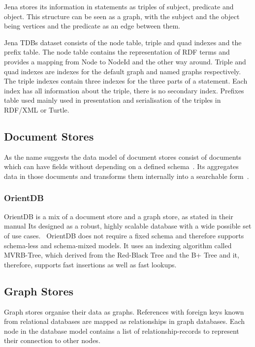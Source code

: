 Jena stores its information in statements as triples of subject, predicate and object.
This structure can be seen as a graph, with the subject and the object being vertices and the predicate as an edge between them.

Jena TDBs dataset consists of the node table, triple and quad indexes and the prefix table.
The node table contains the representation of RDF terms and provides a mapping from Node to NodeId and the other way around.
Triple and quad indexes are indexes for the default graph and named graphs respectively.
The triple indexes contain three indexes for the three parts of a statement.
Each index has all information about the triple,
there is no secondary index.
Prefixes table used mainly used in presentation and serialisation of the triples in RDF/XML or Turtle.~\cite{ApacheTDB}

\subsection{Document Stores}
As the name suggests the data model of document stores consist of documents which can have fields without depending on a defined schema~\cite{OrientDB}.
Its aggregates data in those documents and transforms them internally into a searchable form~\cite{Techopedia2017}.

\subsubsection{OrientDB}
OrientDB is a mix of a document store and a graph store,
as stated in their manual 
Its designed as a robust, highly scalable database with a wide possible set of use cases.~\cite{OrientDB}
OrientDB does not require a fixed schema and therefore supports schema-less and schema-mixed models.
It uses an indexing algorithm called MVRB-Tree,
which derived from the Red-Black Tree and the B+ Tree and it,
therefore,
supports fast insertions as well as fast lookups.\cite{Abubakar2014}

\subsection{Graph Stores}
\label{ch:background:se:graphStores}
Graph stores organise their data as graphs.
References with foreign keys known from relational databases are mapped as relationships in graph databases.
Each node in the database model contains a list of relationship-records to represent their connection to other nodes.~\cite{NeoTechnologyInc.2016}

